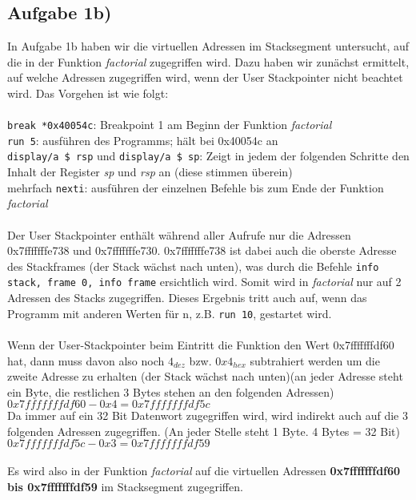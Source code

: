 \documentclass{ti2}
\begin{document}
\subsection*{Aufgabe 1b)}
In Aufgabe 1b haben wir die virtuellen Adressen im Stacksegment untersucht, auf die in der Funktion \textit{factorial} zugegriffen wird. Dazu haben wir zunächst ermittelt, auf welche Adressen zugegriffen wird, wenn der User Stackpointer nicht beachtet wird. Das Vorgehen ist wie folgt: \\ \\
\texttt{break *0x40054c}: Breakpoint 1 am Beginn der Funktion \textit{factorial}\\
\texttt{run 5}: ausführen des Programms; hält bei 0x40054c an \\
\texttt{display/a \$ rsp} und \texttt{display/a \$ sp}: Zeigt in jedem der folgenden Schritte den Inhalt der Register \textit{sp} und \textit{rsp} an (diese stimmen überein) \\
mehrfach \texttt{nexti}: ausführen der einzelnen Befehle bis zum Ende der Funktion \textit{factorial}  \\ \\
Der User Stackpointer enthält während aller Aufrufe nur die Adressen 0x7fffffffe738 und 0x7fffffffe730. 0x7fffffffe738 ist dabei auch die oberste Adresse des Stackframes (der Stack wächst nach unten), was durch die Befehle \texttt{info stack, frame 0, info frame} ersichtlich wird. Somit wird in \textit{factorial} nur auf 2 Adressen des Stacks zugegriffen. Dieses Ergebnis tritt auch auf, wenn das Programm mit anderen Werten für n, z.B. \texttt{run 10}, gestartet wird.  \\ \\
Wenn der User-Stackpointer beim Eintritt die Funktion den Wert 0x7fffffffdf60 hat, dann muss davon also noch $4_{dez}$ bzw. $0x4_{hex}$ subtrahiert werden um die zweite Adresse zu erhalten (der Stack wächst nach unten)(an jeder Adresse steht ein Byte, die restlichen 3 Bytes stehen an den folgenden Adressen) \\
$0x7fffffffdf60 - 0x4 = 0x7fffffffdf5c$\\ 
Da immer auf ein 32 Bit Datenwort zugegriffen wird, wird indirekt auch auf die 3 folgenden Adressen zugegriffen. (An jeder Stelle steht 1 Byte. 4 Bytes = 32 Bit) 
\\
$0x7fffffffdf5c - 0x3 = 0x7fffffffdf59$ \\ \\
Es wird also in der Funktion \textit{factorial} auf die virtuellen Adressen \textbf{0x7fffffffdf60 bis 0x7fffffffdf59} im Stacksegment zugegriffen. 
\end{document}
